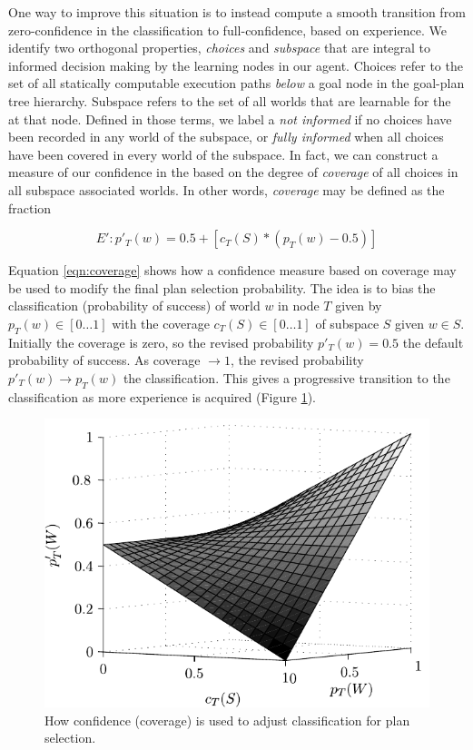 One way to improve this situation is to instead compute a smooth transition from zero-confidence in the \dt classification to full-confidence, based on experience. We identify two orthogonal properties, \textit{choices} and \textit{subspace} that are integral to informed decision making by the learning nodes in our agent. Choices refer to the set of all statically computable execution paths \textit{below} a goal node in the goal-plan tree hierarchy. Subspace refers to the set of all worlds that are learnable for the \dt at that node. Defined in those terms, we label a \dt \textit{not informed} if no choices have been recorded in any world of the subspace, or \textit{fully informed} when all choices have been covered in every world of the subspace. In fact, we can construct a measure of our confidence in the \dt based on the degree of \textit{coverage} of all choices in all subspace associated worlds. In other words, \textit{coverage} may be defined as the fraction 

\begin{equation}
\label{eqn:coverage}   
E': p'_T(w)= 0.5 + \left[  c_T(S) *  \left( p_T(w) - 0.5 \right)  \right]
\end{equation}

Equation \ref{eqn:coverage} shows how a confidence measure based on coverage may be used to modify the final plan selection probability. The idea is to bias the \dt classification (probability of success) of world $w$ in node $T$ given by $p_T(w) \in [0 \ldots 1]$ with the coverage $c_T(S) \in [0 \ldots 1]$ of subspace $S$ given $w \in S$. Initially the coverage is zero, so the revised probability $p'_T(w) = 0.5$ the default probability of success. As coverage $\rightarrow 1$, the revised probability $p'_T(w) \rightarrow p_T(w)$ the \dt classification. This gives a progressive transition to the \dt classification as more experience is acquired (Figure \ref{fig:coverage-surface}).

\begin{figure}[ht]
   \centering
   \includegraphics[width=\columnwidth]{figs/coverage-surface}
   \caption{How confidence (coverage) is used to adjust \dt classification for plan selection.}
   \label{fig:coverage-surface}
\end{figure}


